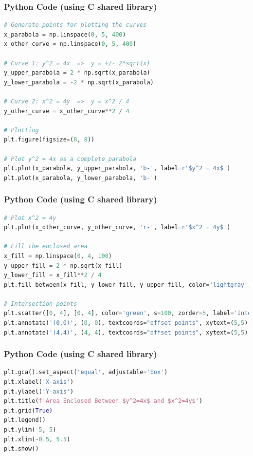 \documentclass{beamer}
\begin{document}
\begin{frame}[fragile]
\frametitle{Python Code (using C shared library)}
\begin{lstlisting}[language=Python]
# Generate points for plotting the curves
x_parabola = np.linspace(0, 5, 400) 
x_other_curve = np.linspace(0, 5, 400) 

# Curve 1: y^2 = 4x  =>  y = +/- 2*sqrt(x)
y_upper_parabola = 2 * np.sqrt(x_parabola)
y_lower_parabola = -2 * np.sqrt(x_parabola)

# Curve 2: x^2 = 4y  =>  y = x^2 / 4
y_other_curve = x_other_curve**2 / 4

# Plotting
plt.figure(figsize=(8, 8))

# Plot y^2 = 4x as a complete parabola
plt.plot(x_parabola, y_upper_parabola, 'b-', label=r'$y^2 = 4x$') 
plt.plot(x_parabola, y_lower_parabola, 'b-') 
\end{lstlisting}
\end{frame}

\begin{frame}[fragile]
\frametitle{Python Code (using C shared library)}
\begin{lstlisting}[language=Python]
# Plot x^2 = 4y
plt.plot(x_other_curve, y_other_curve, 'r-', label=r'$x^2 = 4y$')

# Fill the enclosed area 
x_fill = np.linspace(0, 4, 100)
y_upper_fill = 2 * np.sqrt(x_fill) 
y_lower_fill = x_fill**2 / 4       
plt.fill_between(x_fill, y_lower_fill, y_upper_fill, color='lightgray', alpha=0.5, label='Enclosed Area')

# Intersection points
plt.scatter([0, 4], [0, 4], color='green', s=100, zorder=5, label='Intersection Points')
plt.annotate('(0,0)', (0, 0), textcoords="offset points", xytext=(5,5), ha='left')
plt.annotate('(4,4)', (4, 4), textcoords="offset points", xytext=(5,5), ha='left')
\end{lstlisting}
\end{frame}

\begin{frame}[fragile]
\frametitle{Python Code (using C shared library)}
\begin{lstlisting}[language=Python]
plt.gca().set_aspect('equal', adjustable='box')
plt.xlabel('X-axis')
plt.ylabel('Y-axis')
plt.title(f'Area Enclosed Between $y^2=4x$ and $x^2=4y$')
plt.grid(True)
plt.legend()
plt.ylim(-5, 5) 
plt.xlim(-0.5, 5.5) 
plt.show()
\end{lstlisting}
\end{frame}
\end{document}
